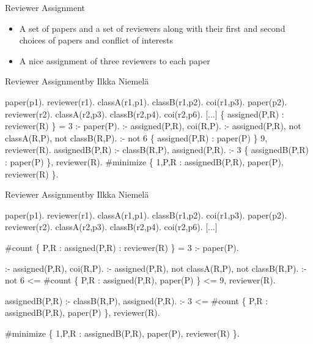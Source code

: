 \begin{frame}{Reviewer Assignment}

  \bigskip

  \begin{itemize}
  \item<1-> 
    A set of papers and a set of reviewers along with their first and second choices of papers and conflict of interests
    \medskip
  \item<1-> 
    A \alert<2>{nice} assignment of three reviewers to each paper
  \end{itemize}

\end{frame}
\begin{frame}[fragile,shrink=1]{Reviewer Assignment}{by Ilkka Niemelä}
\begin{semiverbatim}
paper(p1).  reviewer(r1). classA(r1,p1). classB(r1,p2). coi(r1,p3).
paper(p2).  reviewer(r2). classA(r2,p3). classB(r2,p4). coi(r2,p6).
[...]
\pause
\{ assigned(P,R) : reviewer(R) \} = 3 :-  paper(P).
\pause
 :- assigned(P,R), coi(R,P).
 :- assigned(P,R), not classA(R,P), not classB(R,P).
 :- not 6 \{ assigned(P,R) : paper(P) \} 9, reviewer(R).
\pause
assignedB(P,R) :-  classB(R,P), assigned(P,R).
 :- 3 \{ assignedB(P,R) : paper(P) \}, reviewer(R).
\pause
#minimize \{ 1,P,R : assignedB(P,R), paper(P), reviewer(R) \}.



\end{semiverbatim}
\end{frame}
\begin{frame}[fragile,shrink=1]{Reviewer Assignment}{by Ilkka Niemelä}
\begin{semiverbatim}
paper(p1).  reviewer(r1). classA(r1,p1). classB(r1,p2). coi(r1,p3).
paper(p2).  reviewer(r2). classA(r2,p3). classB(r2,p4). coi(r2,p6).
[...]

\alert<2>{#count} \{ \alert<2>{P,R :} assigned(P,R) \alert<2>{:} reviewer(R) \} = 3 :-  paper(P).

 :- assigned(P,R), coi(R,P).
 :- assigned(P,R), not classA(R,P), not classB(R,P).
 :- not 6 \alert<2>{<= #count} \{ \alert<2>{P,R :} assigned(P,R)\alert<2>{,} paper(P) \} \alert<2>{<= 9}, reviewer(R).

assignedB(P,R) :-  classB(R,P), assigned(P,R).
 :- 3 \alert<2>{<= #count} \{ \alert<2>{P,R :} assignedB(P,R), paper(P) \}, reviewer(R).

#minimize \{ 1,P,R : assignedB(P,R), paper(P), reviewer(R) \}.



\end{semiverbatim}
\end{frame}
%
